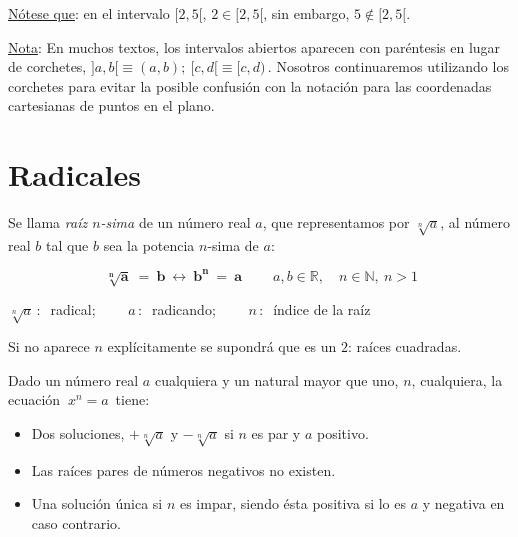 \vspace{4mm} \underline{Nótese que}:  \hspace{.5cm} en el intervalo $[2,5[$, $2 \in [2,5[$, sin embargo, $5 \notin [2,5[$.

\vspace{4mm}\underline{Nota}: \hspace{.5cm} En muchos textos, los intervalos abiertos aparecen con paréntesis en lugar de corchetes, $]a,b[\equiv (a,b);\ [c,d[\equiv [c,d)\, . $ Nosotros continuaremos utilizando los corchetes para evitar la posible confusión con la notación para las coordenadas cartesianas de puntos en el plano.

\vspace{1cm}
\section{Radicales}
\vspace{0.5cm}

\begin{definition}[ Radical ]

Se llama \emph{raíz $n$-sima} de un número real $a$, que representamos por $\sqrt[n]{a}$, al número real $b$ tal que $b$ sea la potencia $n$-sima de $a$:

$$ \boxed{ \ \boldsymbol{\sqrt[n]{a}\ = \ b \ \leftrightarrow \ b^n\ = \ a } \ }\qquad a,b\in \mathbb R,\quad n\in \mathbb N,\ n>1 $$

$\sqrt[n]{a}\,:\ $ radical; $\qquad a \, : \ $ radicando; $\qquad n\,: \ $ índice de la raíz	
\end{definition}

Si no aparece $n$ explícitamente se supondrá que es un $2$: raíces cuadradas.

\vspace{5mm} Dado un número real $a$ cualquiera y un natural mayor que uno, $n$, cualquiera, la ecuación $\ x^n=a\, $ tiene:

\vspace{-2mm}  \begin{itemize}
\vspace{-2mm} \item Dos soluciones, $+\sqrt[n]{a}$	 y $-\sqrt[n]{a}$ si $n$ es par y $a$ positivo.  
\vspace{-2mm} \item Las raíces pares de números negativos no existen.
\vspace{-2mm} \item Una solución única si $n$ es impar, siendo ésta positiva si lo es $a$ y negativa en caso contrario. 
\end{itemize}


